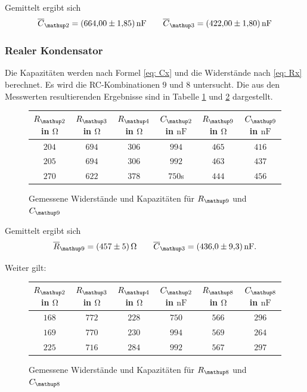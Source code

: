Gemittelt ergibt sich
\begin{equation}
\label{eq:wert_c12_c_13}
\overline{C}_{\map{2}}=\SI{664\pm1.85}{\nano\farad} \qquad \overline{C}_{\map{3}}=\SI{422\pm1.80}{\nano\farad}
\end{equation}

\subsubsection{Realer Kondensator}

Die Kapazitäten werden nach Formel \eqref{eq: Cx} und die
Widerstände nach \eqref{eq: Rx} berechnet.
Es wird die RC-Kombinationen $9$ und $8$ untersucht.
Die aus den Messwerten resultierenden Ergebnisse sind in Tabelle
\ref{tab:rc_r9} und \ref{tab:rc_r8} dargestellt.

\begin{figure}
\centering
\caption{Gemessene Widerstände und Kapazitäten für $R\ua{9}$ und $C\ua{9}$}
  \label{tab:rc_r9}
\begin{tabular}{S S S S S S }
    \toprule
    {$R\ua{2}$ in $\si{\ohm}$} &  {$R\ua{3}$ in $\si{\ohm}$} & {$R\ua{4}$ in $\si{\ohm}$} & {$C\ua{2}$ in $\si{\nano\farad}$}& {$R\ua{9}$ in $\si{\ohm}$} &  {$C\ua{9}$ in $\si{\nano\farad}$} \\
    \midrule
     {$\num{204}$} & {$\num{694}$} &  {$\num{306}$}& {$\num{994}$}  &  {$\num{465}$} & {$\num{416}$}\\
     {$\num{205}$} & {$\num{694}$}  & {$\num{306}$} & {$\num{992}$} & {$\num{463}$} & {$\num{437}$}\\
     {$\num{270}$} & {$\num{622}$}  & {$\num{378}$} & {$\num{750}$s} &{$\num{444}$} & {$\num{456}$}  \\

     \bottomrule
  \end{tabular}
 \end{figure}
Gemittelt ergibt sich
\begin{equation}
\label{eq:wert_r9_c_9}
\overline{R}_{\map{9}}=\SI{457\pm5}{\ohm} \qquad \overline{C}_{\map{3}}=\SI{436\pm9.3}{\nano\farad}.
\end{equation}

Weiter gilt:

\begin{figure}
\centering
\caption{Gemessene Widerstände und Kapazitäten für $R\ua{8}$ und $C\ua{8}$}
  \label{tab:rc_r8}
  \begin{tabular}{S S S S S S}
  \toprule
    {$R\ua{2}$ in $\si{\ohm}$} &  {$R\ua{3}$ in $\si{\ohm}$} & {$R\ua{4}$ in $\si{\ohm}$} & {$C\ua{2}$ in $\si{\nano\farad}$}& {$R\ua{8}$ in $\si{\ohm}$} &  {$C\ua{8}$ in $\si{\nano\farad}$} \\
    \midrule
    {$\num{168}$} & {$\num{772}$} &  {$\num{228}$}& {$\num{750}$}  &  {$\num{566}$} & {$\num{296}$}\\
     {$\num{169}$} & {$\num{770}$}  & {$\num{230}$} & {$\num{994}$} & {$\num{569}$} & {$\num{264}$}\\
     {$\num{225}$} & {$\num{716}$}  & {$\num{284}$} & {$\num{992}$} &{$\num{567}$} & {$\num{297}$}  \\
     \bottomrule
    \end{tabular}
\end{figure}

